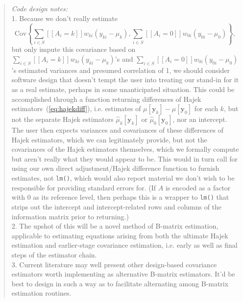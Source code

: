 \begin{quote}
\textit{Code design notes:}\\
1. Because we don't really estimate
\begin{equation*}
  \mathrm{Cov}\left\{
\sum_{i\in S} [\![A_i=k]\!] w_{ki} (y_{ki} - \mu_k), 
\sum_{i\in S} [\![A_i=0]\!] w_{0i} (y_{0i} - \mu_0)
\right\},
\end{equation*}
but only impute this covariance based on
$\sum_{i\in S} [\![A_i=k]\!] w_{ki} (y_{ki} - \mu_k)$'s and 
$\sum_{i\in S} [\![A_i=0]\!] w_{0i} (y_{0i} - \mu_0)$'s estimated
variances and presumed correlation of 1, we should consider software design that doesn't tempt the user into
treating our stand-in for it as a real estimate, perhaps in some
unanticipated situation.  This could be accomplished through a
function returning differences of Hajek
estimators~(\ref{eq:hajekdiff}), i.e. estimates of $\mu[\mathbf{y}_{k}] -
\mu[\mathbf{y}_{0}]$ for each $k$, but not the separate Hajek estimators
$\hat{\mu}_{k}[\mathbf{y}_{k}]$ or $\hat{\mu}_{0}[\mathbf{y}_{0}]$, nor an
intercept. The user then expects variances and covariances of these
differences of Hajek estimators, which we can legitimately provide,
but not the covariances of the Hajek estimators themselves, which we
formally compute but aren't really what they would appear to be.  This
would in turn call for using our own direct adjustment/Hajek
difference function to furnish estimates, not \texttt{lm()}, which
would also report material we don't wish to be responsible for
providing standard errors for.  (If $A$ is encoded as a factor with 0
as its reference level, then perhaps this is a wrapper to
\texttt{lm()} that strips out the intercept and intercept-related rows
and columns of the information matrix prior to returning.)\\
2. The upshot of this will be a novel method of B-matrix estimation,
applicable to estimating equations arising from both the ultimate
Hajek estimation and earlier-stage covariance estimation, i.e. early as well as final
steps of the estimator chain.\\
3. Current literature \citet[e.g.,][\ldots]{mukerjeeDasguptaRubin18,pashleymiratrix18varestimationblockeddesigns} may well present other design-based covariance
estimators worth implementing as alternative B-matrix estimators.
It'd be best to design in such a way as to facilitate alternating
among B-matrix estimation routines.  
\end{quote}

